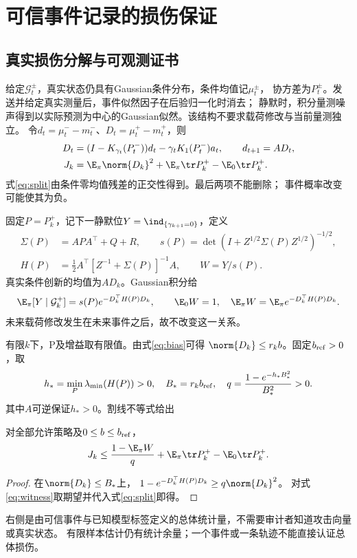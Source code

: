 \section{可信事件记录的损伤保证}
\subsection{真实损伤分解与可观测证书}
给定$\mathcal G_t^\pm$，真实状态仍具有Gaussian条件分布，条件均值记$\mu_t^\pm$，
协方差为$P_t^\pm$。发送并给定真实测量后，事件似然因子在后验归一化时消去；
静默时，积分量测噪声得到以实际预测为中心的Gaussian似然。该结构不要求载荷修改与当前量测独立。
令$d_t=\mu_t^--m_t^-$、$D_t=\mu_t^+-m_t^+$，则
\begin{align}
D_t&=(I-K_{\gamma_t}(P_t^-))d_t-\gamma_tK_1(P_t^-)a_t,\qquad
d_{t+1}=AD_t,\label{eq:bias}\\
J_k&=\E_\pi\norm{D_k}^2+
\E_\pi\tr P_k^+-\E_0\tr P_k^+.\label{eq:split}
\end{align}
式\eqref{eq:split}由条件零均值残差的正交性得到。最后两项不能删除；
事件概率改变可能使其为负。

固定$P=P_k^+$，记下一静默位$Y=\ind_{\{\gamma_{k+1}=0\}}$，定义
\begin{align}
\Sigma(P)&=APA^\top+Q+R,\qquad
s(P)=\det(I+Z^{1/2}\Sigma(P)Z^{1/2})^{-1/2},\nonumber\\
H(P)&=\tfrac12 A^\top[Z^{-1}+\Sigma(P)]^{-1}A,\qquad
W=Y/s(P).
\end{align}
真实条件创新的均值为$AD_k$。Gaussian积分给
\begin{equation}
\E_\pi[Y\mid\mathcal G_k^+]=s(P)e^{-D_k^\top H(P)D_k},
\qquad \E_0W=1,\quad \E_\pi W=\E_\pi e^{-D_k^\top H(P)D_k}.
\label{eq:witness}
\end{equation}
未来载荷修改发生在未来事件之后，故不改变这一关系。

有限$k$下，P及增益取有限值。由式\eqref{eq:bias}可得
$\norm{D_k}\le r_kb$。固定$b_{\rm ref}>0$，取
\[
h_*=\min_P\lambda_{\min}(H(P))>0,\quad
B_*=r_kb_{\rm ref},\quad q=\frac{1-e^{-h_*B_*^2}}{B_*^2}>0.
\]
其中$A$可逆保证$h_*>0$。割线不等式给出
\begin{proposition}[可信下一事件的总体损伤证书]
对全部允许策略及$0\le b\le b_{\rm ref}$，
\begin{equation}
J_k\le \frac{1-\E_\pi W}{q}
+\E_\pi\tr P_k^+-\E_0\tr P_k^+.
\label{eq:certificate}
\end{equation}
\end{proposition}
\begin{proof}
在$\norm{D_k}\le B_*$上，
$1-e^{-D_k^\top H(P)D_k}\ge q\norm{D_k}^2$。
对式\eqref{eq:witness}取期望并代入式\eqref{eq:split}即得。
\end{proof}
右侧是由可信事件与已知模型标签定义的总体统计量，不需要审计者知道攻击向量或真实状态。
有限样本估计仍有统计余量；一个事件或一条轨迹不能直接认证总体损伤。

